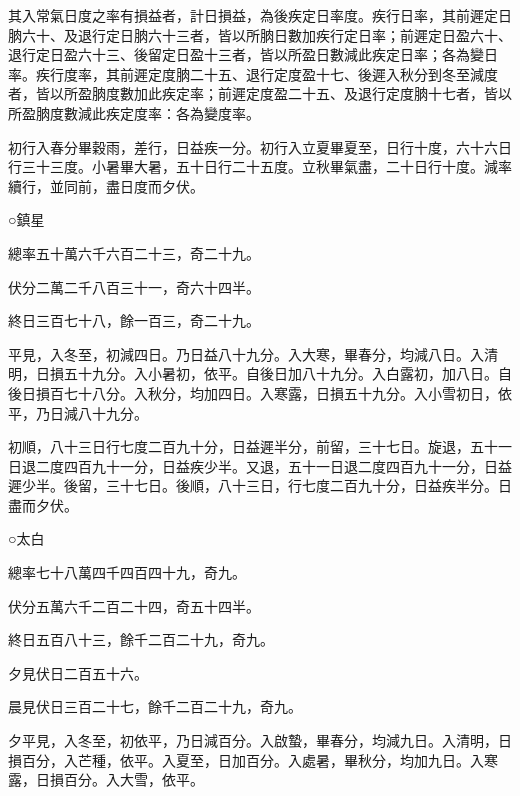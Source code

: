 \begin{pinyinscope}
 其入常氣日度之率有損益者，計日損益，為後疾定日率度。疾行日率，其前遲定日朒六十、及退行定日朒六十三者，皆以所朒日數加疾行定日率；前遲定日盈六十、退行定日盈六十三、後留定日盈十三者，皆以所盈日數減此疾定日率；各為變日率。疾行度率，其前遲定度朒二十五、退行定度盈十七、後遲入秋分到冬至減度者，皆以所盈朒度數加此疾定率；前遲定度盈二十五、及退行定度朒十七者，皆以所盈朒度數減此疾定度率：各為變度率。



 初行入春分畢穀雨，差行，日益疾一分。初行入立夏畢夏至，日行十度，六十六日行三十三度。小暑畢大暑，五十日行二十五度。立秋畢氣盡，二十日行十度。減率續行，並同前，盡日度而夕伏。



 ○鎮星



 總率五十萬六千六百二十三，奇二十九。



 伏分二萬二千八百三十一，奇六十四半。



 終日三百七十八，餘一百三，奇二十九。



 平見，入冬至，初減四日。乃日益八十九分。入大寒，畢春分，均減八日。入清明，日損五十九分。入小暑初，依平。自後日加八十九分。入白露初，加八日。自後日損百七十八分。入秋分，均加四日。入寒露，日損五十九分。入小雪初日，依平，乃日減八十九分。



 初順，八十三日行七度二百九十分，日益遲半分，前留，三十七日。旋退，五十一日退二度四百九十一分，日益疾少半。又退，五十一日退二度四百九十一分，日益遲少半。後留，三十七日。後順，八十三日，行七度二百九十分，日益疾半分。日盡而夕伏。



 ○太白



 總率七十八萬四千四百四十九，奇九。



 伏分五萬六千二百二十四，奇五十四半。



 終日五百八十三，餘千二百二十九，奇九。



 夕見伏日二百五十六。



 晨見伏日三百二十七，餘千二百二十九，奇九。



 夕平見，入冬至，初依平，乃日減百分。入啟蟄，畢春分，均減九日。入清明，日損百分，入芒種，依平。入夏至，日加百分。入處暑，畢秋分，均加九日。入寒露，日損百分。入大雪，依平。




\end{pinyinscope}
